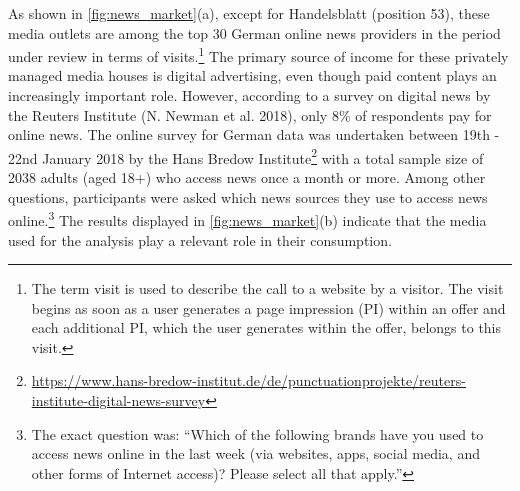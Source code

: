 \documentclass[
  12pt,
]{article}
\begin{document}
As shown in \autoref{fig:news_market}(a), except for Handelsblatt
(position 53), these media outlets are among the top 30 German online
news providers in the period under review in terms of visits.\footnote{The
  term visit is used to describe the call to a website by a visitor. The
  visit begins as soon as a user generates a page impression (PI) within
  an offer and each additional PI, which the user generates within the
  offer, belongs to this visit.} The primary source of income for these
privately managed media houses is digital advertising, even though paid
content plays an increasingly important role. However, according to a
survey on digital news by the Reuters Institute (N. Newman et al. 2018),
only 8\% of respondents pay for online news. The online survey for
German data was undertaken between 19th - 22nd January 2018 by the Hans
Bredow Institute\footnote{\url{https://www.hans-bredow-institut.de/de/punctuationprojekte/reuters-institute-digital-news-survey}}
with a total sample size of 2038 adults (aged 18+) who access news once
a month or more. Among other questions, participants were asked which
news sources they use to access news online.\footnote{The exact question
  was: ``Which of the following brands have you used to access news
  online in the last week (via websites, apps, social media, and other
  forms of Internet access)? Please select all that apply.''} The
results displayed in \autoref{fig:news_market}(b) indicate that the
media used for the analysis play a relevant role in their consumption.
\end{document}
